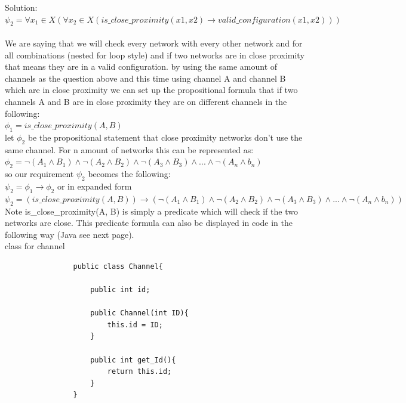 \documentclass{article}
\begin{document}
\begin{enumerate}[(a)]
\begin{enumerate}[(i)]
            Solution: \\
            $\psi_2 = \forall x_1 \in X(\forall x_2 \in X(is\_close\_proximity(x1, x2) \to valid\_configuration(x1, x2)))$\\\\
            We are saying that we will check every network with every other network and for all combinations (nested for loop style) and if two networks are in close proximity that means they are in a valid configuration. by using the same amount of channels as the question above and this time using channel A and channel B which are in close proximity we can set up the propositional formula that if two channels A and B are in close proximity they are on different channels in the following:\\
            $\phi_1 = is\_close\_proximity(A, B)$\\
            let $\phi_2$ be the propositional statement that close proximity networks don't use the same channel. For n amount of networks this can be represented as:\\
            $\phi_2 = \neg(A_1 \land B_1) \land \neg(A_2 \land B_2) \land \neg(A_3 \land B_3) \land ... \land \neg(A_n \land b_n)$\\
            so our requirement $\psi_2$ becomes the following:\\
            $\psi_2 = \phi_1 \to \phi_2$ or in expanded form\\
            $\psi_2 = (is\_close\_proximity(A,B)) \to (\neg(A_1 \land B_1) \land \neg(A_2 \land B_2) \land \neg(A_3 \land B_3) \land ... \land \neg(A_n \land b_n))$\\
            Note is\_close\_proximity(A, B) is simply a predicate which will check if the two networks are close. This predicate formula can also be displayed in code in the following way (Java see next page).\\
            
            \newpage
            class for channel
            \begin{lstlisting}
                public class Channel{
                
                    public int id;
                    
                    public Channel(int ID){
                        this.id = ID;
                    }
                    
                    public int get_Id(){
                        return this.id;
                    }
                }
            \end{lstlisting}
            

\end{enumerate}
\end{enumerate}
\end{document}
